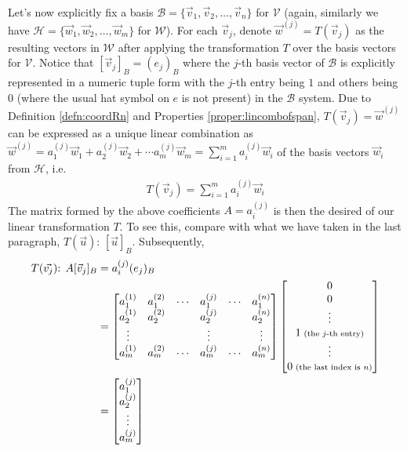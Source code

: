 \\
Let's now explicitly fix a basis $\mathcal{B} = \{\vec{v}_1, \vec{v}_2, \ldots, \vec{v}_n\}$ for $\mathcal{V}$ (again, similarly we have $\mathcal{H} = \{\vec{w}_1, \vec{w}_2, \ldots, \vec{w}_m\}$ for $\mathcal{W}$). For each $\vec{v}_j$, denote $\vec{w}^{(j)} = T(\vec{v}_j)$ as the resulting vectors in $\mathcal{W}$ after applying the transformation $T$ over the basis vectors for $\mathcal{V}$. Notice that $[\vec{v}_j]_B = (e_j)_B$ where the $j$-th basis vector of $\mathcal{B}$ is explicitly represented in a numeric tuple form with the $j$-th entry being $1$ and others being $0$ (where the usual hat symbol on $e$ is not present) in the $\mathcal{B}$ system. Due to Definition \ref{defn:coordRn} and Properties \ref{proper:lincombofspan}, $T(\vec{v}_j) = \vec{w}^{(j)}$ can be expressed as a unique linear combination as $\vec{w}^{(j)} = a_1^{(j)}\vec{w}_1 + a_2^{(j)}\vec{w}_2 + \cdots a_m^{(j)}\vec{w}_m = \sum_{i=1}^{m} a_i^{(j)}\vec{w}_i$ of the basis vectors $\vec{w}_i$ from $\mathcal{H}$, i.e.
\begin{align*}
T(\vec{v}_j) = \sum_{i=1}^{m} a_i^{(j)}\vec{w}_i
\end{align*}
The matrix formed by the above coefficients $A = a_i^{(j)}$ is then the desired  of our linear transformation $T$. To see this, compare with what we have taken in the last paragraph, $T(\vec{u})$: $[\vec{u}]_B$. Subsequently,
\begin{align*}
T(\vec{v_j})\text{: } A[\vec{v}_j]_B &= a_i^{(j)}(e_j)_B \\
&=
\begin{bmatrix}
a_1^{(1)} & a_1^{(2)} & \cdots & a_1^{(j)} & \cdots & a_1^{(n)} \\
a_2^{(1)} & a_2^{(2)} & & a_2^{(j)} & & a_2^{(n)} \\
\vdots & & & \vdots & & \vdots \\
a_m^{(1)} & a_m^{(2)} & \cdots & a_m^{(j)} & \cdots & a_m^{(n)}
\end{bmatrix}
\begin{bmatrix}
0 \\
0 \\
\vdots \\
1 {\scriptsize \text{ (the $j$-th entry)}} \\
\vdots \\
0 {\scriptsize \text{ (the last index is $n$)}}
\end{bmatrix} \\
&=
\begin{bmatrix}
a_1^{(j)} \\
a_2^{(j)} \\
\vdots \\
a_m^{(j)}
\end{bmatrix}
\end{align*}

